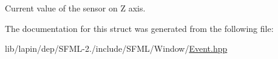Current value of the sensor on Z axis. 



The documentation for this struct was generated from the following file\-:\begin{DoxyCompactItemize}
\item 
lib/lapin/dep/\-S\-F\-M\-L-\/2./include/\-S\-F\-M\-L/\-Window/\hyperlink{lib_2lapin_2dep_2_s_f_m_l-2_83_2include_2_s_f_m_l_2_window_2_event_8hpp}{Event.\-hpp}\end{DoxyCompactItemize}
